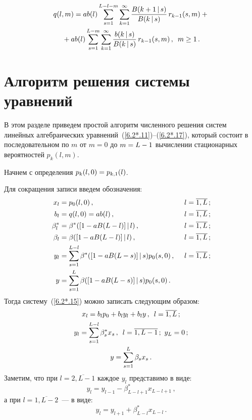 \begin{multicols}{2}
\vspace*{-9pt}

\noindent
\begin{multline}
q(l,m) = a b(l)
\sum\limits_{s=1}^{L-l-m}
\sum\limits_{k=1}^\infty
\displaystyle\frac{\displaystyle B(k+1\,|\,s)\mathstrut}{\displaystyle  B(k\,|\,s)\mathstrut}\,
r_{k-1}(s,m)  +{}\\
{}+ a b(l) \sum\limits_{s=1}^{L-m}
\sum\limits_{k=1}^\infty
\displaystyle\frac{\displaystyle b(k\,|\,s)\mathstrut}{\displaystyle  B(k\,|\,s)\mathstrut}\,
r_{k-1}(s,m)\,,
\enskip m \ge 1\,.
\label{6.2*.17}
\end{multline}

\section{Алгоритм решения системы уравнений}

В этом разделе приведем простой алгоритм чис\-лен\-но\-го
решения сис\-тем линейных алгебраических урав\-не\-ний~(\ref{6.2*.11})--(\ref{6.2*.17}),
который со\-сто\-ит в последовательном по $m$ от $m=0$
до $m\hm=L\hm-1$ вычислении стационарных вероятностей
$p_{k}(l,m)$.

Начнем с определения $p_{k}(l,0)\hm=p_{k,1}(l)$.

Для сокращения записи введем обозначения:
\begin{alignat*}{2}
x_l &= p_{0}(l,0)\,, &\enskip l&=\overline{1,L}\,;
\\
b_l &= q(l,0) = a b(l)\,, &\enskip l&=\overline{1,L}\,;
\\
\beta^*_l &= \beta^*([1 - a B(L-l)]\,|\,l)\,, &\enskip l&=\overline{1,L}\,;
\\
\beta_l &= \beta([1 - a B(L-l)]\,|\,l)\,, &\enskip  l&=\overline{1,L}\,;
\\
y_l &= \sum\limits_{s=1}^{L-l} \beta^*([1 - a B(L-s)]\,|\,s) p_{0}(s,0)\,, &\enskip l&=\overline{1,L}\,;
\\
y &= \sum\limits_{s=1}^{L} \beta([1 - a B(L-s)]\,|\,s) p_{0}(s,0) \,.&&
\end{alignat*}
Тогда систему~(\ref{6.2*.15}) можно записать следующим
образом:
\begin{gather}
\label{6.3*.1}
x_{l}= b_l p_0 + b_l y_l + b_l y \,,\enskip l=\overline{1,L}\,;
\\
\label{6.3*.2}
y_l = \sum\limits_{s=1}^{L-l} \beta^*_s x_s \,,\enskip l=\overline{1,L-1}\,;
\ y_{L} = 0\,;
\\
\label{6.3*.3}
y= \sum\limits_{s=1}^{L} \beta_s x_s \,.
\end{gather}
Заметим, что при $l=\overline{2,L-1}$ каждое $y_l$
представимо в виде:
\begin{equation}
\label{6.3*.4}
y_l = y_{l-1} - \beta^*_{L-l+1} x_{L-l+1}\,,
\end{equation}
а при $l=\overline{1,L-2}$~--- в виде:
\begin{equation}
\label{6.3*.5}
y_l = y_{l+1} + \beta^*_{L-l} x_{L-l}\,.
\end{equation}


\end{multicols}
